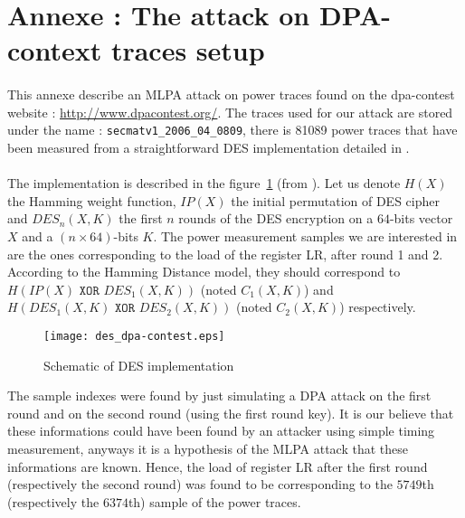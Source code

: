 \documentclass[11pt,a4paper]{article}
\begin{document}
{{{{{{{{{{{ 


\section*{Annexe : The attack on DPA-context traces setup}
\paragraph{}
This annexe describe an MLPA attack on power traces found on the dpa-contest website : \url{http://www.dpacontest.org/}. The traces used for our attack are stored 
under the name : \texttt{secmatv1\_2006\_04\_0809}, there is 81089 power traces that have been measured from a straightforward DES implementation detailed in \cite{guilleyHoogvorstPascalet07}. 
\paragraph{}
The implementation is described in the figure~\ref{fig:DES_dpacontest} (from \cite{guilleyHoogvorstPascalet07}). Let us denote $H(X)$ the Hamming weight function, 
$IP(X)$ the initial permutation of DES cipher
and $DES_n(X,K)$ the first $n$ rounds of the DES encryption on a $64$-bits vector $X$ and a $(n\times 64)$-bits $K$. The power measurement samples we are interested in are the ones 
corresponding to the load of the register LR, after round 1 and 2. According to the Hamming Distance model, they should correspond to $H(IP(X) \texttt{ XOR } DES_1(X,K))$ (noted  $C_1(X,K)$) 
and $H(DES_1(X,K) \texttt{ XOR } DES_2(X,K))$ (noted $C_2(X,K)$) respectively.
\begin{figure}[h!]
\begin{center}
  \texttt{[image: des\_dpa-contest.eps]}
\end{center}
\caption{Schematic of DES implementation}
\label{fig:DES_dpacontest}
\end{figure}
The sample indexes were found by just simulating a DPA attack on the first round and on the second round (using the first round key). It is our believe that 
these informations could have been found by an attacker using simple timing measurement, anyways it is a hypothesis of the MLPA attack that these informations are known. Hence, the load of 
register LR after the first round (respectively the second round) was found to be corresponding to the $5749$th (respectively the $6374$th) sample of the power traces. 
}}}}}}}}}}}
\end{document}
